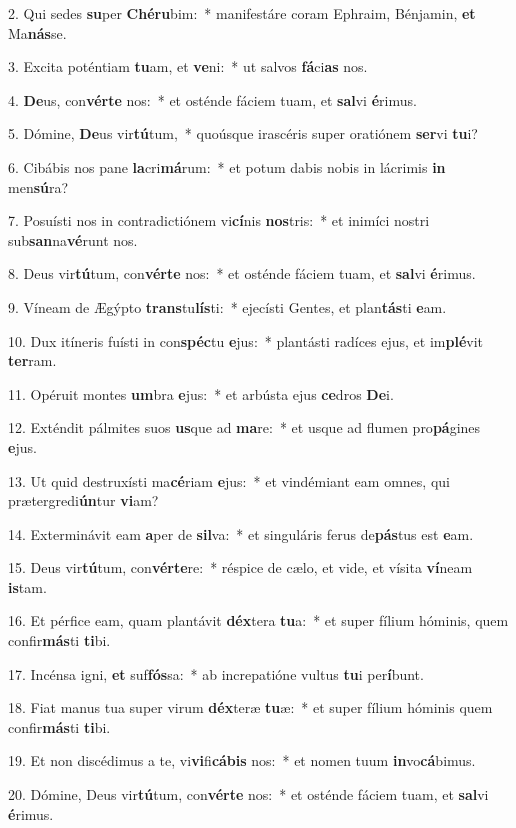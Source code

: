 2. Qui sedes \textbf{su}per \textbf{Ché}\textbf{ru}bim:~*  manifestáre coram Ephraim, Bénjamin, \textbf{et} Ma\textbf{nás}se.\

3. Excita poténtiam \textbf{tu}am, et \textbf{ve}ni:~*  ut salvos \textbf{fá}ci\textbf{as} nos.\

4. \textbf{De}us, con\textbf{vér}\textbf{te} nos:~*  et osténde fáciem tuam, et \textbf{sal}vi \textbf{é}rimus.\

5. Dómine, \textbf{De}us vir\textbf{tú}tum,~*  quoúsque irascéris super oratiónem \textbf{ser}vi \textbf{tu}i?\

6. Cibábis nos pane \textbf{la}cri\textbf{má}rum:~*  et potum dabis nobis in lácrimis \textbf{in} men\textbf{sú}ra?\

7. Posuísti nos in contradictiónem vi\textbf{cí}nis \textbf{nos}tris:~*  et inimíci nostri sub\textbf{san}na\textbf{vé}runt nos.\

8. Deus vir\textbf{tú}tum, con\textbf{vér}\textbf{te} nos:~*  et osténde fáciem tuam, et \textbf{sal}vi \textbf{é}rimus.\

9. Víneam de Ægýpto \textbf{trans}tu\textbf{lís}ti:~*  ejecísti Gentes, et plan\textbf{tás}ti \textbf{e}am.\

10. Dux itíneris fuísti in con\textbf{spéc}tu \textbf{e}jus:~*  plantásti radíces ejus, et im\textbf{plé}vit \textbf{ter}ram.\

11. Opéruit montes \textbf{um}bra \textbf{e}jus:~*  et arbústa ejus \textbf{ce}dros \textbf{De}i.\

12. Exténdit pálmites suos \textbf{us}que ad \textbf{ma}re:~*  et usque ad flumen pro\textbf{pá}gines \textbf{e}jus.\

13. Ut quid destruxísti ma\textbf{cé}riam \textbf{e}jus:~*  et vindémiant eam omnes, qui prætergredi\textbf{ún}tur \textbf{vi}am?\

14. Exterminávit eam \textbf{a}per de \textbf{sil}va:~*  et singuláris ferus de\textbf{pás}tus est \textbf{e}am.\

15. Deus vir\textbf{tú}tum, con\textbf{vér}\textbf{te}re:~*  réspice de cælo, et vide, et vísita \textbf{ví}neam \textbf{is}tam.\

16. Et pérfice eam, quam plantávit \textbf{déx}tera \textbf{tu}a:~*  et super fílium hóminis, quem confir\textbf{más}ti \textbf{ti}bi.\

17. Incénsa igni, \textbf{et} suf\textbf{fós}sa:~*  ab increpatióne vultus \textbf{tu}i per\textbf{í}bunt.\

18. Fiat manus tua super virum \textbf{déx}teræ \textbf{tu}æ:~*  et super fílium hóminis quem confir\textbf{más}ti \textbf{ti}bi.\

19. Et non discédimus a te, vi\textbf{vi}fi\textbf{cá}\textbf{bis} nos:~*  et nomen tuum \textbf{in}vo\textbf{cá}bimus.\

20. Dómine, Deus vir\textbf{tú}tum, con\textbf{vér}\textbf{te} nos:~*  et osténde fáciem tuam, et \textbf{sal}vi \textbf{é}rimus.\


